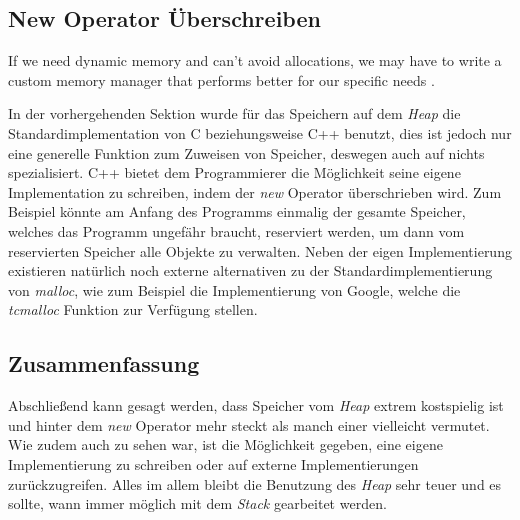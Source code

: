 \subsection{New Operator Überschreiben}
\begin{zitat}
    If we need dynamic memory and can't avoid allocations, we may have to write a custom memory
    manager that performs better for our specific needs \cite{C++HighPer2}.
\end{zitat}
In der vorhergehenden Sektion wurde für das Speichern auf dem \emph{Heap} die Standardimplementation von C
beziehungsweise C++ benutzt, dies ist jedoch nur eine generelle Funktion zum Zuweisen von
Speicher, deswegen auch auf nichts spezialisiert. C++ bietet dem Programmierer die Möglichkeit
seine eigene Implementation zu schreiben, indem der \emph{new} Operator überschrieben wird. Zum
Beispiel könnte am Anfang des Programms einmalig der gesamte Speicher, welches das Programm
ungefähr braucht, reserviert werden, um dann vom reservierten Speicher alle Objekte zu verwalten.
\newline
\newline
Neben der eigen Implementierung existieren natürlich noch externe alternativen zu der
Standardimplementierung von \emph{malloc}, wie zum Beispiel die Implementierung von Google, welche die
\emph{tcmalloc} Funktion zur Verfügung stellen.

\subsection{Zusammenfassung}
Abschließend kann gesagt werden, dass Speicher vom \emph{Heap} extrem kostspielig ist und hinter
dem \emph{new} Operator mehr steckt als manch einer vielleicht vermutet. Wie zudem auch zu sehen
war, ist die Möglichkeit gegeben, eine eigene Implementierung zu schreiben oder auf externe
Implementierungen zurückzugreifen. Alles im allem bleibt die Benutzung des \emph{Heap} sehr teuer
und es sollte, wann immer möglich mit dem \emph{Stack} gearbeitet werden.
